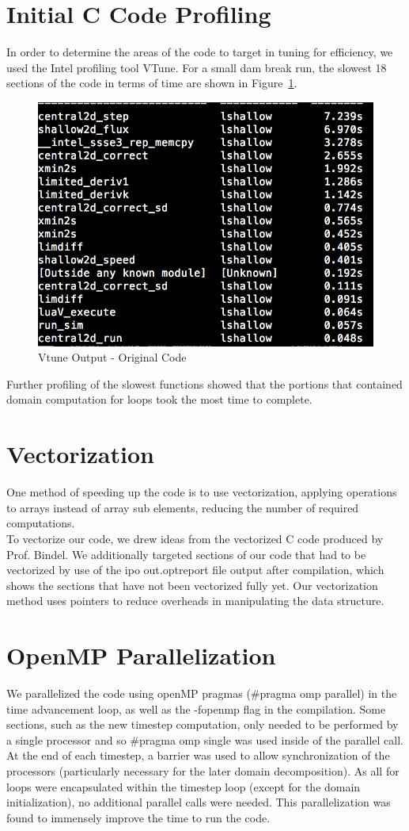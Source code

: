 \documentclass{article}
\begin{document}
\clearpage
\section{Initial C Code Profiling}

In order to determine the areas of the code to target in tuning for efficiency, we used the Intel profiling tool VTune. For a small dam break run, the slowest 18 sections of the code in terms of time are shown in Figure~\ref{v_orig}. 
 
\begin{figure}[here]
 \centering
 \includegraphics[width=0.4\linewidth]{VTUNE_OrigC.png}
 \caption{Vtune Output - Original Code}
 \label{v_orig}
\end{figure}

Further profiling of the slowest functions showed that the portions that contained domain computation for loops took the most time to complete. 

\section{Vectorization}
One method of speeding up the code is to use vectorization, applying operations to arrays instead of array sub elements, reducing the number of required computations. \\

To vectorize our code, we drew ideas from the vectorized C code produced by Prof. Bindel. We additionally targeted sections of our code that had to be vectorized by use of the ipo out.optreport file output after compilation, which shows the sections that have not been vectorized fully yet. Our vectorization method uses pointers to reduce overheads in manipulating the data structure. 

\section{OpenMP Parallelization}
We parallelized the code using openMP pragmas (\#pragma omp parallel) in the time advancement loop, as well as the -fopenmp flag in the compilation. Some sections, such as the new timestep computation, only needed to be performed by a single processor and so \#pragma omp single was used inside of the parallel call. At the end of each timestep, a barrier was used to allow synchronization of the processors (particularly necessary for the later domain decomposition). As all for loops were encapsulated within the timestep loop (except for the domain initialization), no additional parallel calls were needed. This parallelization was found to immensely improve the time to run the code. \\
\end{document}
